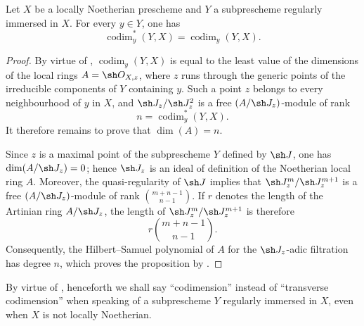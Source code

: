 \begin{proposition}[19.1.4]
\label{IV.19.1.4}
Let $X$ be a locally Noetherian prescheme and $Y$ a subprescheme regularly immersed in $X$. For every $y\in Y$, one has
\begin{equation}
  \operatorname{codim}_y^*(Y,X)=\operatorname{codim}_y(Y,X).
  \tag{19.1.4.1}\label{IV.19.1.4.1}
\end{equation}
\end{proposition}

\begin{proof}
By virtue of , $\operatorname{codim}_y(Y,X)$ is equal to the least value of the dimensions of the local rings $A=\sh O_{X,z}$, where $z$ runs through the generic points of the irreducible components of $Y$ containing $y$. Such a point $z$ belongs to every neighbourhood of $y$ in $X$, and $\sh J_z/\sh J_z^2$ is a free $(A/\sh J_z)$-module of rank
\[
  n=\operatorname{codim}_y^*(Y,X).
\]
It therefore remains to prove that $\dim(A)=n$.


Since $z$ is a maximal point of the subprescheme $Y$ defined by $\sh J$, one has $\dim(A/\sh J_z)=0$; hence $\sh J_z$ is an ideal of definition of the Noetherian local ring $A$. Moreover, the quasi-regularity of $\sh J$ implies that $\sh J_z^m/\sh J_z^{m+1}$ is a free $(A/\sh J_z)$-module of rank $\binom{m+n-1}{n-1}$. If $r$ denotes the length of the Artinian ring $A/\sh J_z$, the length of $\sh J_z^m/\sh J_z^{m+1}$ is therefore
\[
  r\binom{m+n-1}{n-1}.
\]
Consequently, the Hilbert--Samuel polynomial of $A$ for the $\sh J_z$-adic filtration has degree $n$, which proves the proposition by .
\end{proof}

By virtue of , henceforth we shall say ``codimension'' instead of ``transverse codimension'' when speaking of a subprescheme $Y$ regularly immersed in $X$, even when $X$ is not locally Noetherian.

